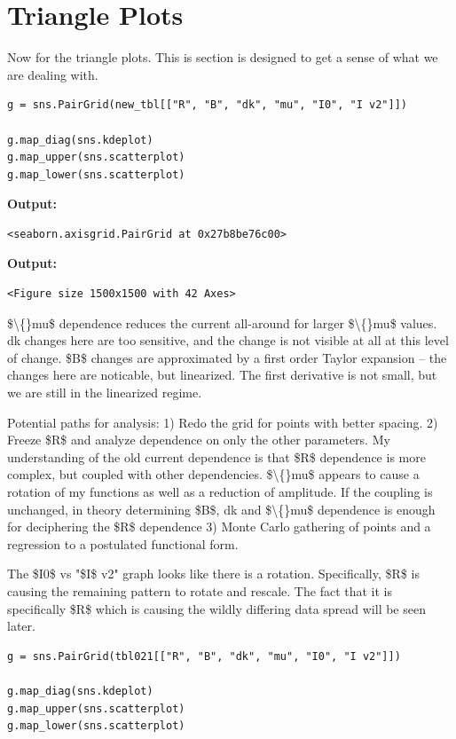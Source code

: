 \documentclass{article}
\begin{document}
\section{Triangle Plots}

Now for the triangle plots. This is section is designed to get a sense of what we are dealing with.

\begin{lstlisting}
g = sns.PairGrid(new_tbl[["R", "B", "dk", "mu", "I0", "I v2"]])

g.map_diag(sns.kdeplot)
g.map_upper(sns.scatterplot)
g.map_lower(sns.scatterplot)\end{lstlisting}

\textbf{Output:}\begin{verbatim}
<seaborn.axisgrid.PairGrid at 0x27b8be76c00>
\end{verbatim}

\textbf{Output:}\begin{verbatim}
<Figure size 1500x1500 with 42 Axes>
\end{verbatim}

\$\textbackslash\{\}mu\$ dependence reduces the current all-around for larger \$\textbackslash\{\}mu\$ values. dk changes here are too sensitive, and the change is not visible at all at this level of change. \$B\$ changes are approximated by a first order Taylor expansion -- the changes here are noticable, but linearized. The first derivative is not small, but we are still in the linearized regime.

Potential paths for analysis:
 1) Redo the grid for points with better spacing.
 2) Freeze \$R\$ and analyze dependence on only the other parameters. My understanding of the old current dependence is that \$R\$ dependence is more complex, but coupled with other dependencies. \$\textbackslash\{\}mu\$ appears to cause a rotation of my functions as well as a reduction of amplitude. If the coupling is unchanged, in theory determining \$B\$, dk and \$\textbackslash\{\}mu\$ dependence is enough for deciphering the \$R\$ dependence
 3) Monte Carlo gathering of points and a regression to a postulated functional form. 

The \$I0\$ vs "\$I\$ v2" graph looks like there is a rotation. Specifically, \$R\$ is causing the remaining pattern to rotate and rescale. The fact that it is specifically \$R\$ which is causing the wildly differing data spread will be seen later.

\begin{lstlisting}
g = sns.PairGrid(tbl021[["R", "B", "dk", "mu", "I0", "I v2"]])

g.map_diag(sns.kdeplot)
g.map_upper(sns.scatterplot)
g.map_lower(sns.scatterplot)\end{lstlisting}
\end{document}
